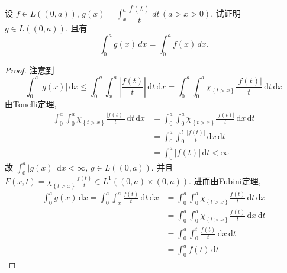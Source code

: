 \documentclass[../main.tex]{subfiles}
\begin{document}
\begin{exercise}{}{}
 设 $f\in L((0,a))$, $g(x)=\int_{x}^{a}\dfrac{f(t)}{t}\,dt\,(a>x>0)$, 试证明 $g\in L((0,a))$, 且有
\[
\int_{0}^{a}g(x)\,dx=\int_{0}^{a}f(x)\,dx.
\]
\end{exercise}
\begin{proof}
    注意到 \[
   \int_{0}^{a}\left| g\left( x \right)  \right|\,\mathrm{d} x\le    \int_{0}^{a}\int_{x}^{a}\left| \frac{f\left( t \right)  }{t }  \right|\,\mathrm{d} t\,\mathrm{d} x= \int_{0}^{a}\int_{0}^{a}\chi _{\left\{ t>  x \right\}}\frac{\left| f\left( t \right)  \right|  }{t }\,\mathrm{d} t\,\mathrm{d} x  
    \]由Tonelli定理, \[
    \begin{aligned}
    \int_{0}^{a}\int_{0}^{a}\chi _{\left\{ t> x \right\}}\frac{\left| f\left( t \right)  \right|  }{t }\,\mathrm{d} t\,\mathrm{d} x&= \int_{0}^{a}\int_{0}^{a}\chi _{\left\{ t> x \right\}}\frac{\left| f\left( t \right)  \right|  }{t }\,\mathrm{d} x\,\mathrm{d} t   \\ 
     &= \int_{0}^{a}\int_{0}^{t}\frac{\left| f\left( t \right)  \right|  }{t }\,\mathrm{d} x\,\mathrm{d} t\\ 
      &= \int_{0}^{a}\left| f\left( t \right)  \right|\,\mathrm{d} t< \infty  
    \end{aligned}
    \]故 \(  \int_{0}^{a}\left| g\left( x \right)  \right|\,\mathrm{d} x< \infty   \), \(  g\in L\left( \left( 0,a \right)  \right)   \).  并且 \( F\left( x,t \right)= \chi _{\left\{ t> x \right\}}  \frac{f\left( t \right)  }{t }\in L^{1}\left( \left( 0,a \right)\times \left( 0,a \right)   \right)    \). 
    进而由Fubini定理,   
 \[
 \begin{aligned}
\int_{0}^{a}g\left( x \right)\,\mathrm{d} x=   \int_{0}^{a}\int_{x}^{a}\frac{f\left( t \right)  }{t }\,\mathrm{d} t \,\mathrm{d} x&= \int_{0}^{a}\int_{0}^{a}\chi _{\left\{ t> x \right\}}\frac{f\left( t \right)  }{t }\,\mathrm{d} t\,\mathrm{d} x \\ 
  &=  \int_{0}^{a}\int_{0}^{a}\chi _{\left\{ t> x \right\}}\frac{f\left( t \right)  }{t }\,\mathrm{d} x\,\mathrm{d} t\\ 
   &= \int_{0}^{a} \int_{0}^{t}\frac{f\left( t \right)  }{t }  \,\mathrm{d} x\,\mathrm{d} t\\ 
    &= \int_{0}^{a}f\left( t \right)\,\mathrm{d} t 
 \end{aligned} 
 \]
\end{proof}
\end{document}

